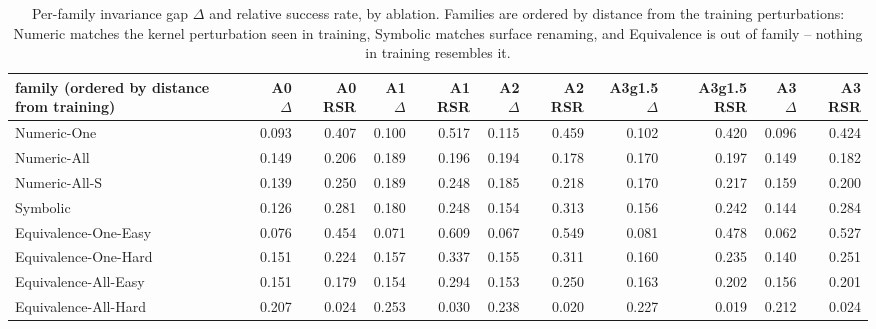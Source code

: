 \begin{table}[t]
\centering
\small
\begin{tabular}{lrrrrrrrrrr}
\toprule
family (ordered by distance from training) & A0 $\Delta$ & A0 RSR & A1 $\Delta$ & A1 RSR & A2 $\Delta$ & A2 RSR & A3g1.5 $\Delta$ & A3g1.5 RSR & A3 $\Delta$ & A3 RSR \\
\midrule
Numeric-One & 0.093 & 0.407 & 0.100 & 0.517 & 0.115 & 0.459 & 0.102 & 0.420 & 0.096 & 0.424 \\
Numeric-All & 0.149 & 0.206 & 0.189 & 0.196 & 0.194 & 0.178 & 0.170 & 0.197 & 0.149 & 0.182 \\
Numeric-All-S & 0.139 & 0.250 & 0.189 & 0.248 & 0.185 & 0.218 & 0.170 & 0.217 & 0.159 & 0.200 \\
Symbolic & 0.126 & 0.281 & 0.180 & 0.248 & 0.154 & 0.313 & 0.156 & 0.242 & 0.144 & 0.284 \\
Equivalence-One-Easy & 0.076 & 0.454 & 0.071 & 0.609 & 0.067 & 0.549 & 0.081 & 0.478 & 0.062 & 0.527 \\
Equivalence-One-Hard & 0.151 & 0.224 & 0.157 & 0.337 & 0.155 & 0.311 & 0.160 & 0.235 & 0.140 & 0.251 \\
Equivalence-All-Easy & 0.151 & 0.179 & 0.154 & 0.294 & 0.153 & 0.250 & 0.163 & 0.202 & 0.156 & 0.201 \\
Equivalence-All-Hard & 0.207 & 0.024 & 0.253 & 0.030 & 0.238 & 0.020 & 0.227 & 0.019 & 0.212 & 0.024 \\
\bottomrule
\end{tabular}
\caption{Per-family invariance gap $\Delta$ and relative success rate, by ablation. Families are ordered by distance from the training perturbations: Numeric matches the kernel perturbation seen in training, Symbolic matches surface renaming, and Equivalence is out of family -- nothing in training resembles it.}
\label{tab:asymob_family}
\end{table}